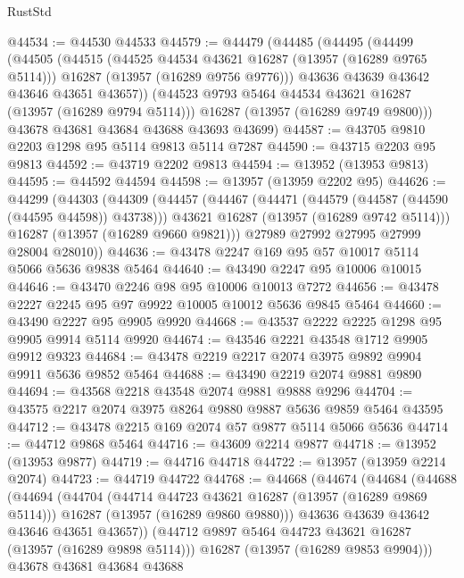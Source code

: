 \begin{lexlean}{RustStd}
\begin{coremodule}
@44534 := @44530 @44533
@44579 := @44479
    (@44485
      (@44495
        (@44499
          (@44505
            (@44515
              (@44525 @44534 @43621 @16287 (@13957 (@16289 @9765 @5114)))
              @16287
              (@13957 (@16289 @9756 @9776)))
            @43636
            @43639
            @43642
            @43646
            @43651
            @43657))
        (@44523 @9793 @5464 @44534 @43621 @16287 (@13957 (@16289 @9794 @5114)))
        @16287
        (@13957 (@16289 @9749 @9800)))
      @43678
      @43681
      @43684
      @43688
      @43693
      @43699)
@44587 := @43705 @9810 @2203 @1298 @95 @5114 @9813 @5114 @7287
@44590 := @43715 @2203 @95 @9813
@44592 := @43719 @2202 @9813
@44594 := @13952 (@13953 @9813)
@44595 := @44592 @44594
@44598 := @13957 (@13959 @2202 @95)
@44626 := @44299
    (@44303
      (@44309
        (@44457
          (@44467
            (@44471 (@44579 (@44587 (@44590 (@44595 @44598)) @43738)))
            @43621
            @16287
            (@13957 (@16289 @9742 @5114)))
          @16287
          (@13957 (@16289 @9660 @9821)))
        @27989
        @27992
        @27995
        @27999
        @28004
        @28010))
@44636 := @43478 @2247 @169 @95 @57 @10017 @5114 @5066 @5636 @9838 @5464
@44640 := @43490 @2247 @95 @10006 @10015
@44646 := @43470 @2246 @98 @95 @10006 @10013 @7272
@44656 := @43478 @2227 @2245 @95 @97 @9922 @10005 @10012 @5636 @9845 @5464
@44660 := @43490 @2227 @95 @9905 @9920
@44668 := @43537 @2222 @2225 @1298 @95 @9905 @9914 @5114 @9920
@44674 := @43546 @2221 @43548 @1712 @9905 @9912 @9323
@44684 := @43478 @2219 @2217 @2074 @3975 @9892 @9904 @9911 @5636 @9852 @5464
@44688 := @43490 @2219 @2074 @9881 @9890
@44694 := @43568 @2218 @43548 @2074 @9881 @9888 @9296
@44704 := @43575 @2217 @2074 @3975 @8264 @9880 @9887 @5636 @9859 @5464 @43595
@44712 := @43478 @2215 @169 @2074 @57 @9877 @5114 @5066 @5636
@44714 := @44712 @9868 @5464
@44716 := @43609 @2214 @9877
@44718 := @13952 (@13953 @9877)
@44719 := @44716 @44718
@44722 := @13957 (@13959 @2214 @2074)
@44723 := @44719 @44722
@44768 := @44668
    (@44674
      (@44684
        (@44688
          (@44694
            (@44704
              (@44714 @44723 @43621 @16287 (@13957 (@16289 @9869 @5114)))
              @16287
              (@13957 (@16289 @9860 @9880)))
            @43636
            @43639
            @43642
            @43646
            @43651
            @43657))
        (@44712 @9897 @5464 @44723 @43621 @16287 (@13957 (@16289 @9898 @5114)))
        @16287
        (@13957 (@16289 @9853 @9904)))
      @43678
      @43681
      @43684
      @43688

\end{coremodule}
\end{lexlean}

